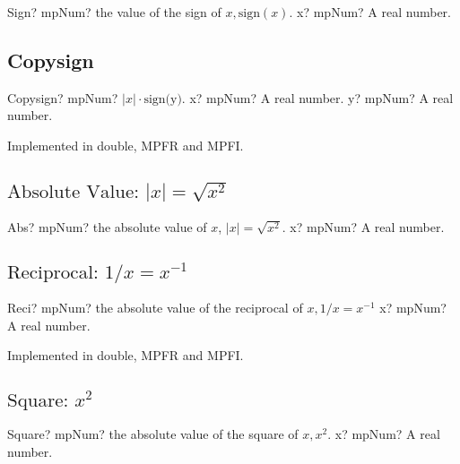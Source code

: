 \begin{mpFunctionsExtract}
	\mpFunctionOne
	{Sign? mpNum? the value of the sign of $x, \text{sign}(x)$.}
	{x? mpNum? A real number.}
\end{mpFunctionsExtract}




\subsection{Copysign}

\begin{mpFunctionsExtract}
	\mpFunctionTwo
	{Copysign? mpNum? $|x|\cdot \text{sign(y)}$.}
	{x? mpNum? A real number.}
	{y? mpNum? A real number.}
\end{mpFunctionsExtract}

Implemented in double, MPFR and MPFI.



\subsection{\texorpdfstring{$\text{Absolute Value: } |x| = \sqrt{x^2}$}{Abs}}

\begin{mpFunctionsExtract}
	\mpFunctionOne
	{Abs? mpNum? the absolute value of $x$, $|x| = \sqrt{x^2}$.}
	{x? mpNum? A real number.}
\end{mpFunctionsExtract}




\subsection{\texorpdfstring{$\text{Reciprocal: } 1/x = x^{-1}$}{reci}}

\begin{mpFunctionsExtract}
	\mpFunctionOne
	{Reci? mpNum? the absolute value of the reciprocal of $x,  1/x = x^{-1}$}
	{x? mpNum? A real number.}
\end{mpFunctionsExtract}

Implemented in double, MPFR and MPFI.



\subsection{\texorpdfstring{$\text{Square: }x^2$}{Square}}

\begin{mpFunctionsExtract}
	\mpFunctionOne
	{Square? mpNum? the absolute value of the square of $x,  x^2$.}
	{x? mpNum? A real number.}
\end{mpFunctionsExtract}

